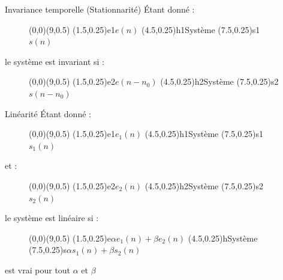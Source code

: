 \documentclass[a4paper,11pt]{beamer}
\begin{document}
\begin{frame}
\begin{block}{Invariance temporelle (Stationnarité)}
Étant donné :
\begin{figure}
	\begin{pspicture}[showgrid=false](0,0)(9,0.5)
		\pssignal(1.5,0.25){e1}{$e(n)$}
		\psfblock[framesize=1.75 0.65](4.5,0.25){h1}{Système}
		\pssignal(7.5,0.25){s1}{$s(n)$}
	\end{pspicture}
\end{figure}
le système est invariant si : 
\begin{figure}
	\begin{pspicture}[showgrid=false](0,0)(9,0.5)
		\pssignal(1.5,0.25){e2}{$e(n - n_0)$}
		\psfblock[framesize=1.75 0.65](4.5,0.25){h2}{Système}
		\pssignal(7.5,0.25){s2}{$s(n - n_0)$}
	\end{pspicture}
\end{figure}
\end{block}
\end{frame}

\begin{frame}
\begin{block}{Linéarité}
Étant donné :
\begin{figure}
	\begin{pspicture}[showgrid=false](0,0)(9,0.5)
		\pssignal(1.5,0.25){e1}{$e_{1}(n)$}
		\psfblock[framesize=1.75 0.65](4.5,0.25){h1}{Système}
		\pssignal(7.5,0.25){s1}{$s_{1}(n)$}
	\end{pspicture}
\end{figure}
et : 
\begin{figure}
	\begin{pspicture}[showgrid=false](0,0)(9,0.5)
		\pssignal(1.5,0.25){e2}{$e_{2}(n)$}
		\psfblock[framesize=1.75 0.65](4.5,0.25){h2}{Système}
		\pssignal(7.5,0.25){s2}{$s_{2}(n)$}
	\end{pspicture}
\end{figure}
le système est linéaire si :
\begin{figure}
	\begin{pspicture}[showgrid=false](0,0)(9,0.5)
		\pssignal(1.5,0.25){e}{$\alpha e_{1}(n) + \beta e_{2}(n)$}
		\psfblock[framesize=1.75 0.65](4.5,0.25){h}{Système}
		\pssignal(7.5,0.25){s}{$\alpha s_{1}(n) + \beta s_{2}(n)$}
	\end{pspicture}
\end{figure}
est vrai pour tout $\alpha$ et $\beta$
\end{block}
\end{frame}
\end{document}
